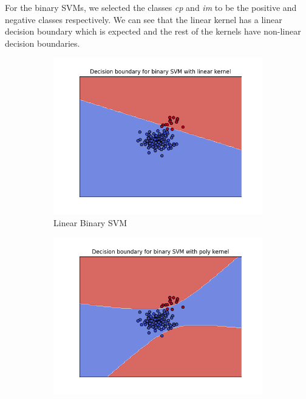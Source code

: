 \documentclass[12pt]{article}
\begin{document}
For the binary SVMs, we selected the classes \textit{cp} and \textit{im} to be the positive and negative classes respectively.
We can see that the linear kernel has a linear decision boundary which is expected and the rest of the kernels have non-linear decision boundaries.
\begin{figure}
    \centering
    \begin{subfigure}{0.45\textwidth}
        \centering
        \includegraphics[width=\textwidth]{plots/linear_binary.png}
        \caption{Linear Binary SVM}
    \end{subfigure}
    \begin{subfigure}{0.45\textwidth}
        \centering
        \includegraphics[width=\textwidth]{plots/poly_binary.png}

\end{subfigure}
\end{figure}
\end{document}
